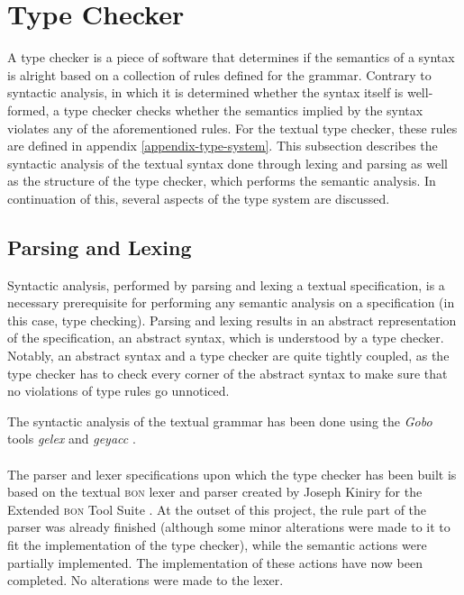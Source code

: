 \section{Type Checker}
A type checker is a piece of software that determines if the semantics of a syntax is alright based on a collection of rules defined for the grammar. Contrary to syntactic analysis, in which it is determined whether the syntax itself is well-formed, a type checker checks whether the semantics implied by the syntax violates any of the aforementioned rules. For the textual \bon{} type checker, these rules are defined in appendix \ref{appendix-type-system}. This subsection describes the syntactic analysis of the textual \bon{} syntax done through lexing and parsing as well as the structure of the type checker, which performs the semantic analysis. In continuation of this, several aspects of the type system are discussed.
\subsection{Parsing and Lexing}
\label{design-parsing}
Syntactic analysis, performed by parsing and lexing a textual \bon{} specification, is a necessary prerequisite for performing any semantic analysis on a specification (in this case, type checking). Parsing and lexing results in an abstract representation of the specification, an abstract syntax, which is understood by a type checker. Notably, an abstract syntax and a type checker are quite tightly coupled, as the type checker has to check every corner of the abstract syntax to make sure that no violations of type rules go unnoticed.

The syntactic analysis of the textual \bon{} grammar has been done using the \textit{Gobo} tools \textit{gelex} and \textit{geyacc} \cite{gobo}.
\paragraph{}
The parser and lexer specifications upon which the type checker has been built is based on the textual \textsc{bon} lexer and parser created by Joseph Kiniry for the Extended \textsc{bon} Tool Suite \cite{ebon}. At the outset of this project, the rule part of the parser was already finished (although some minor alterations were made to it to fit the implementation of the type checker), while the semantic actions were partially implemented. The implementation of these actions have now been completed. No alterations were made to the lexer.

